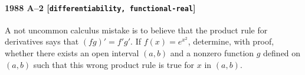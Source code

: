 \paragraph{1988 A--2 \textnormal{[\texttt{differentiability, functional-real}]}}
A not uncommon calculus mistake is to believe that the product rule
for derivatives says that $(fg)' = f'g'$. If $f(x)=e^{x^2}$,
determine, with proof, whether there exists an open interval $(a,b)$
and a nonzero function $g$ defined on $(a,b)$ such that this wrong
product rule is true for $x$ in $(a,b)$.
